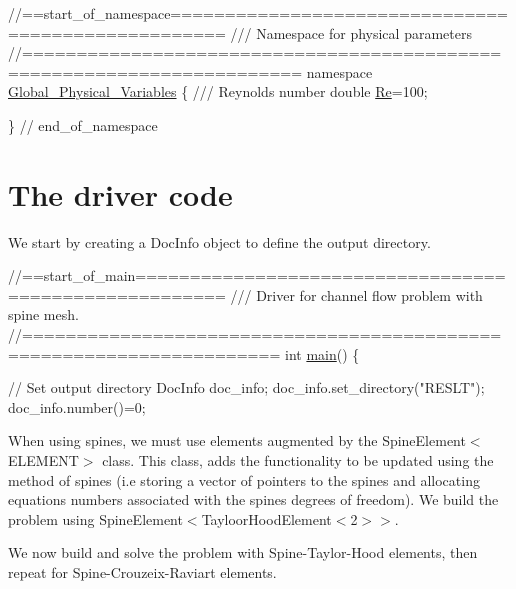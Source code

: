  
\begin{DoxyCodeInclude}
\textcolor{comment}{//==start\_of\_namespace===================================================}
\textcolor{comment}{/// Namespace for physical parameters}
\textcolor{comment}{}\textcolor{comment}{//=======================================================================}
\textcolor{keyword}{namespace }\hyperlink{namespaceGlobal__Physical__Variables}{Global\_Physical\_Variables}
\{
\textcolor{comment}{}
\textcolor{comment}{ /// Reynolds number}
\textcolor{comment}{} \textcolor{keywordtype}{double} \hyperlink{namespaceGlobal__Physical__Variables_ab814e627d2eb5bc50318879d19ab16b9}{Re}=100;

\} \textcolor{comment}{// end\_of\_namespace}

\end{DoxyCodeInclude}




 

\hypertarget{index_main}{}\section{The driver code}\label{index_main}
We start by creating a {\ttfamily Doc\+Info} object to define the output directory.


\begin{DoxyCodeInclude}
\textcolor{comment}{//==start\_of\_main======================================================}
\textcolor{comment}{/// Driver for channel flow problem with spine mesh.}
\textcolor{comment}{}\textcolor{comment}{//=====================================================================}
\textcolor{keywordtype}{int} \hyperlink{simple__spine__channel_8cc_ae66f6b31b5ad750f1fe042a706a4e3d4}{main}()
\{

 \textcolor{comment}{// Set output directory}
 DocInfo doc\_info;
 doc\_info.set\_directory(\textcolor{stringliteral}{"RESLT"});
 doc\_info.number()=0;

\end{DoxyCodeInclude}


When using spines, we must use elements augmented by the {\ttfamily Spine\+Element$<$\+E\+L\+E\+M\+E\+N\+T$>$} class. This class, adds the functionality to be updated using the method of spines (i.\+e storing a vector of pointers to the spines and allocating equations numbers associated with the spines degrees of freedom). We build the problem using {\ttfamily Spine\+Element$<$Tayloor\+Hood\+Element$<$2$>$$>$}.

We now build and solve the problem with Spine-\/\+Taylor-\/\+Hood elements, then repeat for Spine-\/\+Crouzeix-\/\+Raviart elements.


